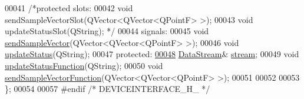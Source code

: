 \begin{DoxyCode}
00041 \textcolor{comment}{/*protected slots:}
00042 \textcolor{comment}{    void sendSampleVectorSlot(QVector<QVector<QPointF> >);}
00043 \textcolor{comment}{    void updateStatusSlot(QString); */}
00044 signals:
00045     \textcolor{keywordtype}{void} \hyperlink{classDeviceInterface_ae1bcd766865161a659076d2561e79dc5}{sendSampleVector}(QVector<QVector<QPointF> >);
00046     \textcolor{keywordtype}{void} \hyperlink{classDeviceInterface_ac64a65f54f41f0b7ff4c846ac7fdbef7}{updateStatus}(QString);
00047 \textcolor{keyword}{protected}:
\hypertarget{deviceinterface_8h_source.tex_l00048}{}\hyperlink{classDeviceInterface_ac98f5cd34bafb43265436b29b9f734fa}{00048}     \hyperlink{classDataStream}{DataStream}& \hyperlink{classDeviceInterface_ac98f5cd34bafb43265436b29b9f734fa}{stream};
00049     \textcolor{keywordtype}{void} \hyperlink{classDeviceInterface_a83df9dc924dbe0e6c3e0d0fef2a604d0}{updateStatusFunction}(QString);
00050     \textcolor{keywordtype}{void} \hyperlink{classDeviceInterface_adae4c7e07e9bdbbe62be961fd306b5c8}{sendSampleVectorFunction}(QVector<QVector<QPointF> >);
00051 
00052 
00053 \};
00054 
00057 \textcolor{preprocessor}{#endif }\textcolor{comment}{/* DEVICEINTERFACE\_H\_ */}\textcolor{preprocessor}{}
\end{DoxyCode}
